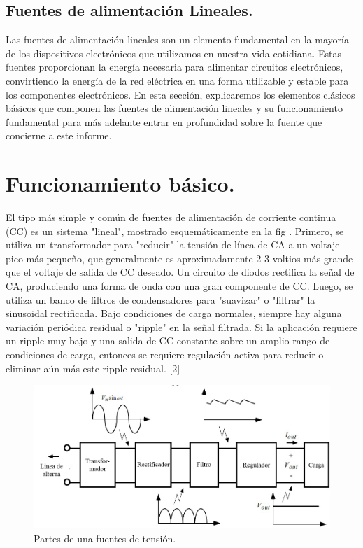 \subsection{Fuentes de alimentación Lineales.}
Las fuentes de alimentación lineales son un elemento fundamental en la mayoría de los dispositivos electrónicos que utilizamos en nuestra vida cotidiana. Estas fuentes proporcionan la energía necesaria para alimentar circuitos electrónicos, convirtiendo la energía de la red eléctrica en una forma utilizable y estable para los componentes electrónicos. En esta sección, explicaremos los elementos clásicos básicos que componen las fuentes de alimentación lineales y su funcionamiento fundamental para más adelante entrar en profundidad sobre la fuente que concierne a este informe.

\section{Funcionamiento básico.}
El tipo más simple y común de fuentes de alimentación de corriente continua (CC) es un sistema "lineal", mostrado esquemáticamente en la fig . Primero, se utiliza un transformador para "reducir" la tensión de línea de CA a un voltaje pico más pequeño, que generalmente es aproximadamente 2-3 voltios más grande que el voltaje de salida de CC deseado. Un circuito de diodos rectifica la señal de CA, produciendo una forma de onda con una gran componente de CC. Luego, se utiliza un banco de filtros de condensadores para "suavizar" o "filtrar" la sinusoidal rectificada. Bajo condiciones de carga normales, siempre hay alguna variación periódica residual o "ripple" en la señal filtrada. Si la aplicación requiere un ripple muy bajo y una salida de CC constante sobre un amplio rango de condiciones de carga, entonces se requiere regulación activa para reducir o eliminar aún más este ripple residual. [2]
\begin{figure}
    \centering
    \includegraphics[scale=0.5]{./imagenes/componentesFL.jpg}
    \caption{Partes de una fuentes de tensión.}
    \label{F:estructura_archivos}
\end{figure}

